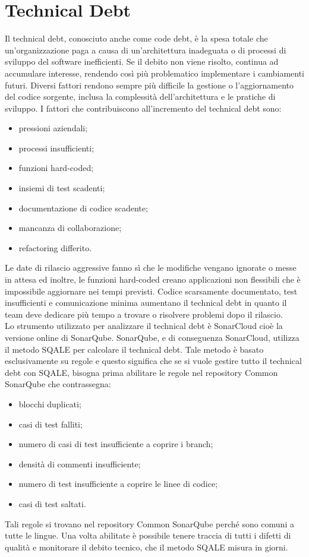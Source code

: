 \section{Technical Debt}
Il technical debt, conosciuto anche come code debt, è la spesa totale che un'organizzazione paga a causa di un'architettura inadeguata o di processi di sviluppo del software inefficienti. Se il debito non viene risolto, continua ad accumulare interesse, rendendo così più problematico implementare i cambiamenti futuri. Diversi fattori rendono sempre più difficile la gestione o l'aggiornamento del codice sorgente, inclusa la complessità dell'architettura e le pratiche di sviluppo. I fattori che contribuiscono all'incremento del technical debt sono:
\begin{itemize}
\item pressioni aziendali;
\item processi insufficienti;
\item funzioni hard-coded;
\item insiemi di test scadenti;
\item documentazione di codice scadente;
\item mancanza di collaborazione;
\item refactoring differito.
\end{itemize}
Le date di rilascio aggressive fanno sì che le modifiche vengano ignorate o messe in attesa ed inoltre, le funzioni hard-coded creano applicazioni non flessibili che è impossibile aggiornare nei tempi previsti. Codice scarsamente documentato, test insufficienti e comunicazione minima aumentano il technical debt in quanto il team deve dedicare più tempo a trovare o risolvere problemi dopo il rilascio.\\ 
Lo strumento utilizzato per analizzare il technical debt è SonarCloud cioè la versione online di SonarQube. SonarQube, e di conseguenza SonarCloud, utilizza il metodo SQALE per calcolare il technical debt. Tale metodo è basato esclusivamente su regole e questo significa che se si vuole gestire tutto il technical debt con SQALE, bisogna prima abilitare le regole nel repository Common SonarQube che contrassegna:
\begin{itemize}
\item blocchi duplicati;
\item casi di test falliti;
\item numero di casi di test insufficiente a coprire i branch;
\item densità di commenti insufficiente;
\item numero di test insufficiente a coprire le linee di codice;
\item casi di test saltati.
\end{itemize}
Tali regole si trovano nel repository Common SonarQube perché sono comuni a tutte le lingue. Una volta abilitate è possibile tenere traccia di tutti i difetti di qualità e monitorare il debito tecnico, che il metodo SQALE misura in giorni.
